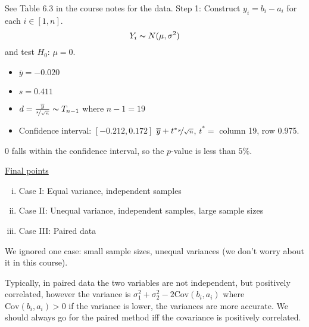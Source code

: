 \begin{exbox}
    \begin{example} See Table 6.3 in the course notes for the data.
        Step 1: Construct $ y_i=b_i-a_i $ for each $ i\in[1,n] $.
        \[ Y_i \thicksim N(\mu,\sigma^2) \]
        and test $ H_0 $: $ \mu=0 $.
        \begin{itemize}
            \item $ \overline{y}=-0.020 $
            \item $ s=0.411 $
            \item $ d=\frac{\overline{y}}{\nicefrac{s}{\sqrt{n}}}\thicksim T_{n-1} $ where $ n-1=19 $
            \item Confidence interval: $ \left[ -0.212,0.172 \right] $
                  \subitem $ \overline{y}+t^* \nicefrac{s}{\sqrt{n}} $, $ t^*= $ column 19, row 0.975.
        \end{itemize}
        $ 0 $ falls within the confidence interval, so the $ p $-value is less than $ 5\% $.
    \end{example}
\end{exbox}

\underline{Final points}
\begin{enumerate}[(i)]
    \item Case I: Equal variance, independent samples
    \item Case II: Unequal variance, independent samples, large sample sizes
    \item Case III: Paired data
\end{enumerate}
We ignored one case: small sample sizes, unequal variances (we don't worry about it in this course).

Typically, in paired data the two variables are not independent, but positively correlated,
however the variance is $ \sigma_1^2+\sigma_2^2-2\text{Cov}(b_i,a_i) $
where $ \text{Cov}(b_i,a_i)>0 $ if the variance is lower, the variances are more accurate.
We should always go for the paired method iff the covariance is positively correlated.
